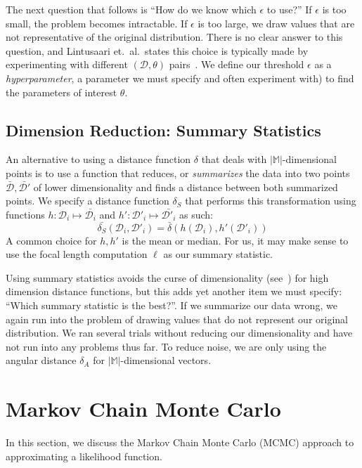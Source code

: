 The next question that follows is ``How do we know which $\epsilon$ to use?''
If $\epsilon$ is too small, the problem becomes intractable.
If $\epsilon$ is too large, we draw values that are not representative of the original distribution.
There is no clear answer to this question, and Lintusaari et.\ al.\ states this choice is typically made by
experimenting with different $(\mathcal{D}, \theta)$ pairs~\cite{lintusaariFundamentalsRecentDevelopments2017}.
We define our threshold $\epsilon$ as a \emph{hyperparameter}, a parameter we must specify and often experiment with)
to find the parameters of interest $\theta$.

\subsection{Dimension Reduction: Summary Statistics}\label{subsec:dimensionReductionSummaryStatistics}
An alternative to using a distance function $\delta$ that deals with $| \mathbb{M} |$-dimensional points is to use a
function that reduces, or \emph{summarizes} the data into two points $\bar{\mathcal{D}}, \bar{\mathcal{D}'}$ of lower
dimensionality and finds a distance between both summarized points.
We specify a distance function $\delta_S$ that performs this transformation using functions
$h : \mathcal{D}_i \mapsto \bar{\mathcal{D}_i}$ and $h' : \mathcal{D}'_i \mapsto \bar{\mathcal{D}'_i}$ as such:
\begin{equation}
    \bar{\delta_S}(\mathcal{D}_i, \mathcal{D}'_i)  = \bar{\delta}(h(\mathcal{D}_i), h'(\mathcal{D}'_i))
\end{equation}
A common choice for $h, h'$ is the mean or median.
For us, it may make sense to use the focal length computation $\hat{\ell}$ as our summary statistic.

Using summary statistics avoids the curse of dimensionality (see~\cite{bellmanDynamicProgramming2013}) for high
dimension distance functions, but this adds yet another item we must specify: ``Which summary statistic is the best?''.
If we summarize our data wrong, we again run into the problem of drawing values that do not represent our original
distribution.
We ran several trials without reducing our dimensionality and have not run into any problems thus far.
To reduce noise, we are only using the angular distance $\delta_A$ for $| \mathbb{M} |$-dimensional vectors.

\section{Markov Chain Monte Carlo}\label{sec:markovChainMonteCarlo}
In this section, we discuss the Markov Chain Monte Carlo (MCMC) approach to approximating a likelihood function.

